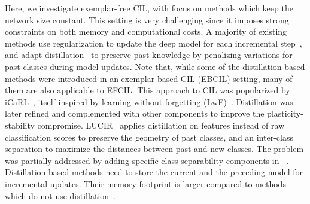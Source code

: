 \documentclass[10pt,twocolumn,letterpaper]{article}
\begin{document}
Here, we investigate exemplar-free CIL, with focus on methods which keep the network size constant.
This setting is very challenging since it imposes strong constraints on both memory and computational costs. 
A majority of existing methods use regularization to update the deep model for each incremental step~\cite{masana2021_study}, and adapt  distillation~\cite{hinton2015_distillation} to preserve past knowledge by penalizing variations for past classes during model updates.
Note that, while some of the distillation-based methods were introduced in an exemplar-based CIL (EBCIL) setting, many of them are also applicable to EFCIL.
This approach to CIL was popularized by iCaRL~\cite{rebuffi2017_icarl}, itself inspired by learning without forgetting (LwF)~\cite{li2016_lwf}.
Distillation was later refined and complemented with other components to improve the plasticity-stability compromise. 
LUCIR~\cite{hou2019_lucir} applies distillation on features instead of raw classification scores to preserve the geometry of past classes, and an inter-class separation to maximize the distances between past and new classes. 
The problem was partially addressed by adding specific class separability components in ~\cite{douillard2020podnet,hou2019_lucir}.
Distillation-based methods need to store the current and the preceding model for incremental updates.
Their memory footprint is larger compared to methods which do not use distillation~\cite{masana2021_study}.
\end{document}
